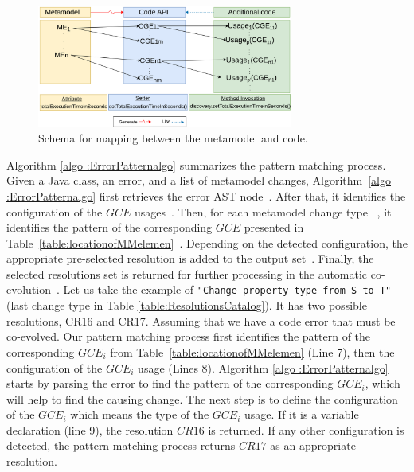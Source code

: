 \begin{figure}[t]\centering%
	\includegraphics[width=0.75\textwidth]{pics/chapter1pics/patternusages.png}
	\caption{Schema for mapping between the metamodel and code.}
	\label{fig:patternconcept}
	\vspace{-1em}
	
\end{figure}

Algorithm \ref{algo :ErrorPatternalgo} summarizes the pattern matching process. 
Given a Java class, an error, and a list of metamodel changes, Algorithm~\ref{algo :ErrorPatternalgo} first retrieves the error AST node~{\small{}}. After that, it identifies the configuration of the $GCE$ usages~{\small{}}. Then, for each metamodel change type ~{\small{}}, it identifies the pattern of the corresponding $GCE$ presented in Table~\ref{table:locationofMMelemen}~{\small{}}. %
Depending on the detected configuration, the appropriate pre-selected resolution is added to the output set~{\small{}}.
Finally, the selected resolutions set is returned for further processing in the automatic co-evolution~{\small{}}. 
Let us take the example of \texttt{"Change property type from S to T"} (last change type in Table \ref{table:ResolutionsCatalog}). It has two possible resolutions, CR16 and CR17. Assuming that we have a code error that must be co-evolved. Our pattern matching process first identifies the pattern of the corresponding $GCE_i$ from Table~\ref{table:locationofMMelemen} (Line 7), then the configuration of the $GCE_i$ usage (Lines 8). 
Algorithm \ref{algo :ErrorPatternalgo} starts by parsing the error to find the pattern of the corresponding $GCE_i$, which will help to find the causing change. The next step is to define the configuration of the $GCE_i$ which means the type of the $GCE_i$ usage. 
If it is a variable declaration (line 9), the resolution $CR16$ is returned. If any other configuration is detected, the pattern matching process returns $CR17$ as an appropriate resolution.

